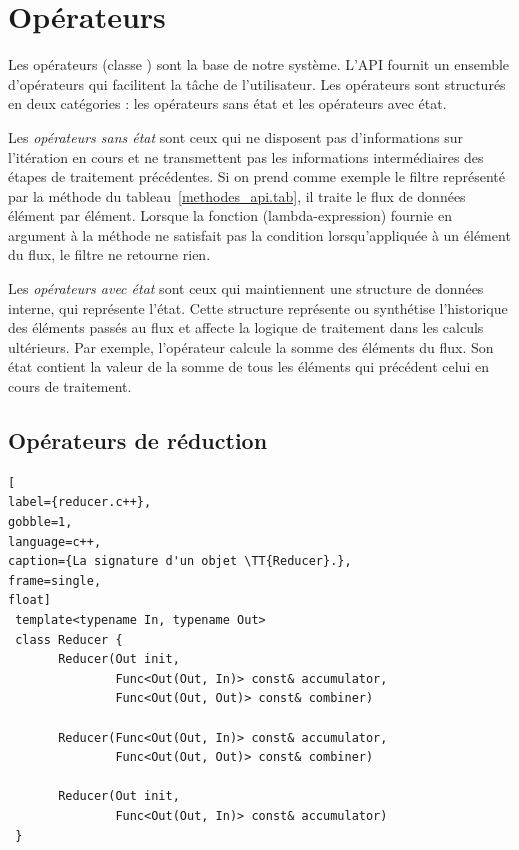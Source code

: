 \section{Op\'erateurs}

Les op\'erateurs (classe ) sont la base de notre syst\`eme. L'API fournit un ensemble d'op\'erateurs qui facilitent la t\^ache de l'utilisateur. Les op\'erateurs sont structur\'es en deux cat\'egories : les op\'erateurs sans \'etat et les op\'erateurs avec \'etat.

Les \emph{op\'erateurs sans \'etat} sont ceux qui ne disposent pas d'informations sur l'it\'eration en cours et ne transmettent pas les informations interm\'ediaires des \'etapes de traitement pr\'ec\'edentes. Si on prend comme exemple le filtre repr\'esent\'e par la m\'ethode  du tableau~\ref{methodes_api.tab}, il traite le flux de donn\'ees \'el\'ement par \'el\'ement. 
%
Lorsque la fonction (lambda-expression) fournie en argument \`a la m\'ethode  ne satisfait pas la condition lorsqu'appliqu\'ee \`a un \'el\'ement du flux, le filtre ne retourne rien. 

Les \emph{op\'erateurs avec \'etat} sont ceux qui maintiennent une structure de donn\'ees interne, qui repr\'esente l'\'etat. Cette structure repr\'esente ou synth\'etise l'historique des \'el\'ements pass\'es au flux et affecte la logique de traitement dans les calculs ult\'erieurs. Par exemple, l'op\'erateur  calcule la somme des \'el\'ements du flux. Son \'etat contient la valeur de la somme de tous les \'el\'ements qui pr\'ec\'edent celui en cours de traitement. 

\subsection*{Op\'erateurs de r\'eduction}

\label{reducer.sect}

\begin{lstlisting}[
label={reducer.c++},
gobble=1,
language=c++,
caption={La signature d'un objet \TT{Reducer}.},
frame=single,
float]
 template<typename In, typename Out>
 class Reducer {
       Reducer(Out init, 
               Func<Out(Out, In)> const& accumulator,
               Func<Out(Out, Out)> const& combiner)

       Reducer(Func<Out(Out, In)> const& accumulator,
               Func<Out(Out, Out)> const& combiner)

       Reducer(Out init, 
               Func<Out(Out, In)> const& accumulator)
 }
\end{lstlisting}



